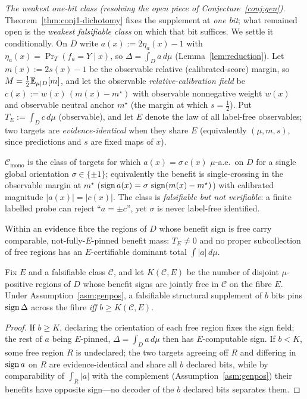 \smallskip
\noindent\emph{The weakest one-bit class (resolving the open piece of
Conjecture~\ref{conj:gen}).}
Theorem~\ref{thm:conj1-dichotomy} fixes the supplement at \emph{one bit}; what remained open is
the \emph{weakest falsifiable class} on which that bit suffices. We settle it conditionally. On
$D$ write $a(x):=2\eta_a(x)-1$ with $\eta_a(x)=\Pr_T(f_a{=}Y\mid x)$, so $\Delta=\int_D a\,d\mu$
(Lemma~\ref{lem:reduction}). Let $m(x):=2s(x)-1$ be the observable relative (calibrated-score)
margin, so $M=\tfrac12\mathbb{E}_{\mu\mid D}[m]$, and let the observable \emph{relative-calibration
field} be $c(x):=w(x)\,(m(x)-m^\star)$ with observable nonnegative weight $w(x)$ and observable
neutral anchor $m^\star$ (the margin at which $s=\tfrac12$). Put $T_E:=\int_D c\,d\mu$
(observable), and let $E$ denote the law of all label-free observables; two targets are
\emph{evidence-identical} when they share $E$ (equivalently $(\mu,m,s)$, since predictions and
$s$ are fixed maps of $x$).

\begin{definition}\label{def:cmono}
$\mathcal C_{\mathrm{mono}}$ is the class of targets for which $a(x)=\sigma\,c(x)$ $\mu$-a.e.\ on
$D$ for a single global orientation $\sigma\in\{\pm1\}$; equivalently the benefit is
single-crossing in the observable margin at $m^\star$ ($\operatorname{sign} a(x)=\sigma\,\operatorname{sign}(m(x)-m^\star)$)
with calibrated magnitude $|a(x)|=|c(x)|$. The class is \emph{falsifiable but not verifiable}: a
finite labelled probe can reject ``$a=\pm c$'', yet $\sigma$ is never label-free identified.
\end{definition}

\begin{assumption}\label{asm:genpos}
Within an evidence fibre the regions of $D$ whose benefit sign is free carry comparable,
not-fully-$E$-pinned benefit mass: $T_E\neq0$ and no proper subcollection of free regions has an
$E$-certifiable dominant total $\int|a|\,d\mu$.
\end{assumption}

\begin{lemma}[Structural sign-freedom $=$ bit complexity]\label{lem:bitcomplexity}
Fix $E$ and a falsifiable class $\mathcal C$, and let $K(\mathcal C,E)$ be the number of disjoint
$\mu$-positive regions of $D$ whose benefit signs are jointly free in $\mathcal C$ on the fibre
$E$. Under Assumption~\ref{asm:genpos}, a falsifiable structural supplement of $b$ bits pins
$\operatorname{sign}\Delta$ across the fibre \emph{iff} $b\ge K(\mathcal C,E)$.
\end{lemma}
\begin{proof}
If $b\ge K$, declaring the orientation of each free region fixes the sign field; the rest of $a$
being $E$-pinned, $\Delta=\int_D a\,d\mu$ then has $E$-computable sign. If $b<K$, some free region
$R$ is undeclared; the two targets agreeing off $R$ and differing in $\operatorname{sign} a$ on $R$ are
evidence-identical and share all $b$ declared bits, while by comparability of $\int_R|a|$ with the
complement (Assumption~\ref{asm:genpos}) their benefits have opposite sign---no decoder of the $b$
declared bits separates them.
\end{proof}

